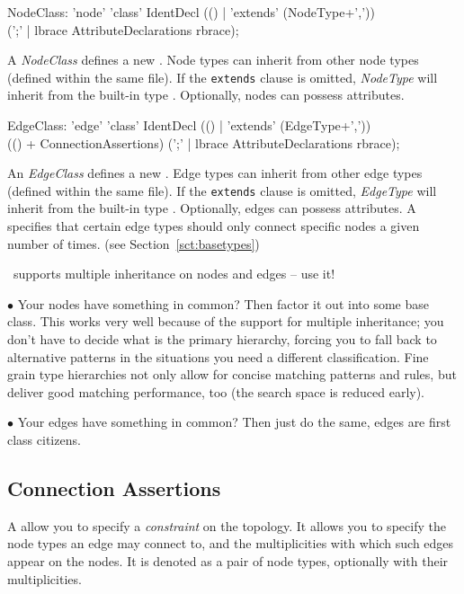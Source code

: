 \begin{rail}
  NodeClass: 'node' 'class' IdentDecl (() | 'extends' (NodeType+',')) \\
    (';' | lbrace AttributeDeclarations rbrace);
\end{rail}
A \emph{NodeClass} defines a new .
Node types can inherit from other node types (defined within the same file).
If the \texttt{extends} clause is omitted, \emph{NodeType} will inherit from the built-in type \texttt{}.
Optionally, nodes can possess attributes.

\begin{rail}
  EdgeClass: 'edge' 'class' IdentDecl (() | 'extends' (EdgeType+',')) \\
    (() + ConnectionAssertions) (';' | lbrace AttributeDeclarations rbrace);
\end{rail}
An \emph{EdgeClass} defines a new .
Edge types can inherit from other edge types (defined within the same file).
If the \texttt{extends} clause is omitted, \emph{EdgeType} will inherit from the built-in type \texttt{}.
Optionally, edges can possess attributes.
A  specifies that certain edge types should only connect specific nodes a given number of times.
(see Section~\ref{sct:basetypes})

\begin{note}
\GrG~supports multiple inheritance on nodes and edges -- use it!

$\bullet$ Your nodes have something in common?
Then factor it out into some base class.
This works very well because of the support for multiple inheritance; you don't have to decide what is the primary hierarchy, forcing you to fall back to alternative patterns in the situations you need a different classification.
Fine grain type hierarchies not only allow for concise matching patterns and rules,
but deliver good matching performance, too (the search space is reduced early).

$\bullet$ Your edges have something in common?
Then just do the same, edges are first class citizens.
\end{note}

\pagebreak

\subsection*{Connection Assertions}
A \emph{} allow you to specify a \emph{constraint} on the topology.
It allows you to specify the node types an edge may connect to, and the multiplicities with which such edges appear on the nodes.
It is denoted as a pair of node types, optionally with their multiplicities.

